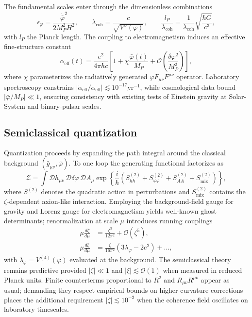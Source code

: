 \documentclass[12pt,a4paper]{article}
\theoremstyle{definition}
\begin{document}
The fundamental scales enter through the dimensionless combinations
\begin{equation}
\epsilon_\varphi = \frac{\dot{\bar{\varphi}}^2}{2 M_P^2 H^2}, \qquad \lambda_{\text{coh}} = \frac{c}{\sqrt{V''(\bar{\varphi})}}, \qquad \frac{l_P}{\lambda_{\text{coh}}} = \frac{1}{\lambda_{\text{coh}}} \sqrt{\frac{\hbar G}{c^3}},
\end{equation}
with $l_P$ the Planck length. The coupling to electromagnetism induces an effective fine-structure constant
\begin{equation}
\alpha_{\text{eff}}(t) = \frac{e^2}{4\pi \hbar c} \left[1 + \chi \frac{\bar{\varphi}(t)}{M_P} + \mathcal{O}\!\left(\frac{\delta\varphi^2}{M_P^2}\right)\right],
\end{equation}
where $\chi$ parameterizes the radiatively generated $\varphi F_{\mu\nu} F^{\mu\nu}$ operator. Laboratory spectroscopy constrains $|\dot{\alpha}_{\text{eff}}/\alpha_{\text{eff}}| \lesssim 10^{-17} \text{yr}^{-1}$\cite{Webb2011}, while cosmological data bound $|\bar{\varphi}/M_P| \ll 1$, ensuring consistency with existing tests of Einstein gravity at Solar-System and binary-pulsar scales.

\subsection{Semiclassical quantization}

Quantization proceeds by expanding the path integral around the classical background $(\bar{g}_{\mu\nu}, \bar{\varphi})$. To one loop the generating functional factorizes as
\begin{equation}
\mathcal{Z} = \int \mathcal{D}h_{\mu\nu} \, \mathcal{D}\delta\varphi \, \mathcal{D}A_\mu \exp\left\{ \frac{i}{\hbar} \left(S^{(2)}_{hh} + S^{(2)}_{\varphi\varphi} + S^{(2)}_{AA} + S^{(2)}_{\text{mix}} \right) \right\},
\end{equation}
where $S^{(2)}$ denotes the quadratic action in perturbations and $S^{(2)}_{\text{mix}}$ contains the $\zeta$-dependent axion-like interaction. Employing the background-field gauge for gravity and Lorenz gauge for electromagnetism yields well-known ghost determinants; renormalization at scale $\mu$ introduces running couplings
\begin{align}
\mu \frac{d\zeta}{d\mu} &= \frac{\zeta^3}{12\pi^2} + \mathcal{O}(\zeta^5), \\
 \mu \frac{d\xi}{d\mu} &= \frac{\xi}{16\pi^2} \left( 3 \lambda_\varphi - 2 e^2 \right) + \ldots,
 \end{align}
with $\lambda_\varphi = V^{(4)}(\bar{\varphi})$ evaluated at the background. The semiclassical theory remains predictive provided $|\zeta| \ll 1$ and $|\xi| \lesssim \mathcal{O}(1)$ when measured in reduced Planck units. Finite counterterms proportional to $R^2$ and $R_{\mu\nu} R^{\mu\nu}$ appear as usual\cite{BirrellDavies1982}; demanding they respect empirical bounds on higher-curvature corrections places the additional requirement $|\zeta| \lesssim 10^{-2}$ when the coherence field oscillates on laboratory timescales.
\end{document}
